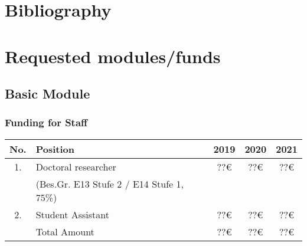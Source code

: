 \documentclass[a4paper,12pt]{article}
\begin{document}




\section{Bibliography}

\vspace{-1.25cm}

\renewcommand\refname{}

{\small
\setlength{\bibsep}{0.55em}
}



\section{Requested modules/funds}


\subsection{Basic Module}


\subsubsection{Funding for Staff}

\begin{center}
\begin{tabular}{c l c c c}
No. & Position & 2019 & 2020 & 2021 \\
\hline 
1.  & Doctoral researcher & ??\euro{} & ??\euro{} & ??\euro{} \\
    & (Bes.Gr. E13 Stufe 2 / E14 Stufe 1, 75\%) & & & \\
2.  & Student Assistant   & ??\euro{} & ??\euro{} & ??\euro{} \\
\hline
    & Total Amount        & ??\euro{} & ??\euro{} & ??\euro{} \\
\end{tabular}
\end{center}
\end{document}
